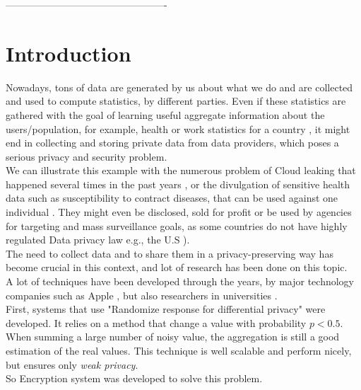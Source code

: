 \documentclass{article}
\begin{document}
-------------------------------------------------

\newpage
\tableofcontents
\newpage



\section*{Introduction}
Nowadays, tons of data are generated by us about what we do and are collected and used to compute statistics, by different parties. Even if these statistics are gathered with the goal of learning useful aggregate information about the users/population, for example, health or work statistics for a country \cite{swiss}, it might end in collecting and storing private data from data providers, which poses a serious privacy and security problem.\\
We can illustrate this example with the numerous problem of Cloud leaking that happened several times in the past years \cite{pentagon}, or the divulgation of sensitive health data such as susceptibility to contract diseases, that can be used against one individual \cite{sell}. They might even be disclosed, sold for profit \cite{sold} or be used by agencies for targeting and mass surveillance goals, as some countries do not have highly regulated Data privacy law e.g., the U.S \cite{law}).\\
The need to collect data and to share them in a privacy-preserving way has become crucial in this context, and lot of research has been done on this topic.\\
A lot of techniques have been developed through the years, by major technology companies such as Apple \cite{apple}, but also researchers in universities \cite{unlynx,prio}.\\
First, systems that use "Randomize response for differential privacy" \cite{randomized} were developed. It relies on a method that change a value with probability $p < 0.5$.
When summing a large number of noisy value, the aggregation is still a good estimation of the real values. This technique is well scalable and perform nicely, but ensures only \textit{weak privacy}.\\
So Encryption system was developed to solve this problem.
\end{document}
